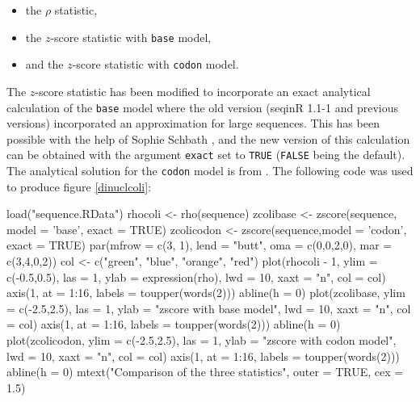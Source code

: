 \documentclass{article}
\begin{document}
\begin{itemize}
\item the $\rho$ statistic,
\item the $z$-score statistic with \texttt{base} model,
\item and the $z$-score statistic with \texttt{codon} model.
\end{itemize}

The $z$-score statistic has been modified to incorporate an exact
analytical calculation of the \texttt{base} model where the old 
version (seqinR 1.1-1 and previous versions) incorporated an
approximation for large sequences. This has been possible with the
help of Sophie Schbath \cite{Schbath-thesis}, and the new version of
this calculation can be obtained with the argument \texttt{exact} 
set to \texttt{TRUE} (\texttt{FALSE} being the default). 
The analytical solution for the \texttt{codon} model is from \cite{GautierC1985}.
The following
code was used to produce figure \ref{dinuclcoli}:

\begin{Schunk}
\begin{Sinput}
 load("sequence.RData")
 rhocoli <- rho(sequence)
 zcolibase <- zscore(sequence, model = 'base', exact = TRUE)
 zcolicodon <- zscore(sequence,model = 'codon', exact = TRUE)
 par(mfrow = c(3, 1), lend = "butt", oma = c(0,0,2,0), mar = c(3,4,0,2))
 col <- c("green", "blue", "orange", "red")
 plot(rhocoli - 1, ylim = c(-0.5,0.5), las = 1, 
   ylab = expression(rho), lwd = 10, xaxt = "n",
   col = col)
 axis(1, at = 1:16, labels = toupper(words(2)))
 abline(h = 0)
 plot(zcolibase, ylim = c(-2.5,2.5), las = 1, 
   ylab = "zscore with base model", lwd = 10, xaxt = "n",
   col = col)
 axis(1, at = 1:16, labels = toupper(words(2)))
 abline(h = 0)
 plot(zcolicodon, ylim = c(-2.5,2.5), las = 1, 
   ylab = "zscore with codon model", lwd = 10, xaxt = "n",
   col = col)
 axis(1, at = 1:16, labels = toupper(words(2)))
 abline(h = 0)
 mtext("Comparison of the three statistics", outer = TRUE, cex = 1.5)
\end{Sinput}
\end{Schunk}

\begin{figure}
\centering{}
\end{figure}
\end{document}
